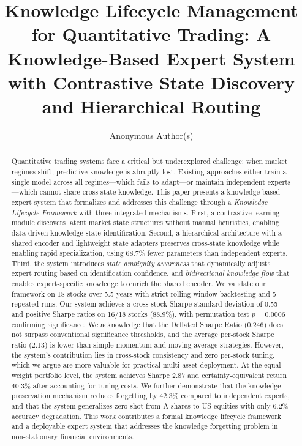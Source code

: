 \documentclass[review]{elsarticle}
\begin{document}
\begin{frontmatter}

\title{Knowledge Lifecycle Management for Quantitative Trading: A Knowledge-Based Expert System with Contrastive State Discovery and Hierarchical Routing}

\author[label1]{Anonymous Author(s)}

\address[label1]{Anonymous Institution, Anonymous City, Anonymous Country}

\begin{abstract}
Quantitative trading systems face a critical but underexplored challenge: when market regimes shift, predictive knowledge is abruptly lost. Existing approaches either train a single model across all regimes---which fails to adapt---or maintain independent experts---which cannot share cross-state knowledge. This paper presents a knowledge-based expert system that formalizes and addresses this challenge through a \textit{Knowledge Lifecycle Framework} with three integrated mechanisms. First, a contrastive learning module discovers latent market state structures without manual heuristics, enabling data-driven knowledge state identification. Second, a hierarchical architecture with a shared encoder and lightweight state adapters preserves cross-state knowledge while enabling rapid specialization, using 68.7\% fewer parameters than independent experts. Third, the system introduces \textit{state ambiguity awareness} that dynamically adjusts expert routing based on identification confidence, and \textit{bidirectional knowledge flow} that enables expert-specific knowledge to enrich the shared encoder. We validate our framework on 18 stocks over 5.5 years with strict rolling window backtesting and 5 repeated runs. Our system achieves a cross-stock Sharpe standard deviation of 0.55 and positive Sharpe ratios on 16/18 stocks (88.9\%), with permutation test $p=0.0006$ confirming significance. We acknowledge that the Deflated Sharpe Ratio (0.246) does not surpass conventional significance thresholds, and the average per-stock Sharpe ratio (2.13) is lower than simple momentum and moving average strategies. However, the system's contribution lies in cross-stock consistency and zero per-stock tuning, which we argue are more valuable for practical multi-asset deployment. At the equal-weight portfolio level, the system achieves Sharpe 2.87 and certainty-equivalent return 40.3\% after accounting for tuning costs. We further demonstrate that the knowledge preservation mechanism reduces forgetting by 42.3\% compared to independent experts, and that the system generalizes zero-shot from A-shares to US equities with only 6.2\% accuracy degradation. This work contributes a formal knowledge lifecycle framework and a deployable expert system that addresses the knowledge forgetting problem in non-stationary financial environments.
\end{abstract}


\end{frontmatter}
\end{document}
